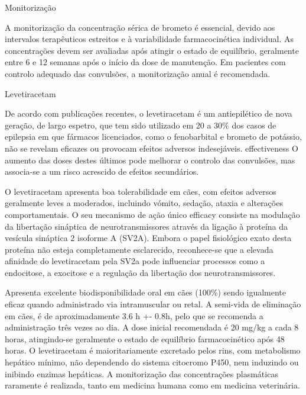 Monitorização


A monitorização da concentração sérica de brometo é essencial, devido aos intervalos terapêuticos estreitos e à variabilidade farmacocinética individual. \cite{Gouveia2024} As concentrações devem ser avaliadas após atingir o estado de equilíbrio, geralmente entre 6 e 12 semanas após o início da dose de manutenção. \cite{Gouveia2024} Em pacientes com controlo adequado das convulsões, a monitorização anual é recomendada.\cite{Gouveia2024}


Levetiracetam


De acordo com publicações recentes, o levetiracetam é um antiepilético de nova geração, de largo espetro, \cite{Volk2008} que tem sido utilizado em 20 a 30\% dos casos de epilepsia em que fármacos licenciados, como o fenobarbital e brometo de potássio, não se revelam eficazes ou provocam efeitos adversos indesejáveis. \cite{Erath2020} effectiveness\cite{ajvr} O aumento das doses destes últimos pode melhorar o controlo das convulsões, mas associa-se a um risco acrescido de efeitos secundários.\cite{Volk2008}


O levetiracetam apresenta boa tolerabilidade em cães, com efeitos adversos geralmente leves a moderados, incluindo vómito, sedação, ataxia e alterações comportamentais. \cite{Erath2020} O seu mecanismo de ação único \cite{ajvr}\cite{Contreras-Garcia2022}\cite{Deshpande2014}\cite{Kelly2017} \cite{CeldranDeCastro2023} efficacy consiste na modulação da libertação sináptica de neurotransmissores através da ligação à proteína da vesícula sináptica 2 isoforme A (SV2A). \cite{CeldranDeCastro2023} \cite{Volk2008} \cite{Contreras-Garcia2022} \cite{Kelly2017}\cite{Packer2015}\cite{Linder2024} Embora o papel fisiológico exato desta proteína não esteja completamente esclarecido, reconhece-se que a elevada afinidade do levetiracetam  pela SV2a pode influenciar processos como a endocitose, a exocitose e a regulação da libertação dos neurotransmissores.\cite{Volk2008}


Apresenta excelente biodisponibilidade oral em cães (100\%)\cite{Volk2008} sendo igualmente eficaz quando administrado via intramuscular ou retal. \cite{Kelly2017} A semi-vida de eliminação em cães, é de aproximadamente 3.6 h +- 0.8h, pelo que se recomenda a administração três vezes ao dia.\cite{Volk2008} A dose inicial recomendada é 20 mg/kg a cada 8 horas, \cite{Linder2024} atingindo-se geralmente o estado de equilíbrio farmacocinético após 48 horas.\cite{Volk2008}
O levetiracetam é maioritariamente excretado pelos rins, com metabolismo hepático mínimo, \cite{Kelly2017} não dependendo do sistema citocromo P450, nem induzindo ou inibindo enzimas hepáticas.\cite{Volk2008} A monitorização das concentrações plasmáticas raramente é realizada, tanto em medicina humana\cite{Volk2008} como em medicina veterinária.


